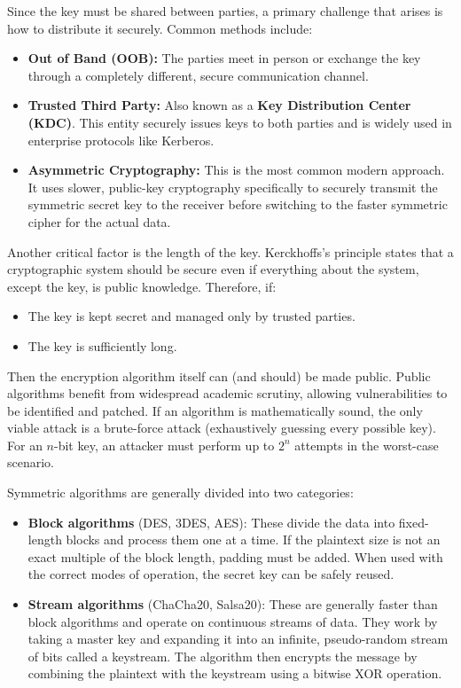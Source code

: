 Since the key must be shared between parties, a primary challenge that arises is how to distribute it securely. Common methods include:
\begin{itemize}
    \item \textbf{Out of Band (OOB):} The parties meet in person or exchange the key through a completely different, secure communication channel.
    \item \textbf{Trusted Third Party:} Also known as a \textbf{Key Distribution Center (KDC)}. This entity securely issues keys to both parties and is widely used in enterprise protocols like Kerberos.
    \item \textbf{Asymmetric Cryptography:} This is the most common modern approach. It uses slower, public-key cryptography specifically to securely transmit the symmetric secret key to the receiver before switching to the faster symmetric cipher for the actual data.
\end{itemize}

Another critical factor is the length of the key. Kerckhoffs's principle states that a cryptographic system should be secure even if everything about the system, except the key, is public knowledge. Therefore, if:
\begin{itemize}
    \item The key is kept secret and managed only by trusted parties.
    \item The key is sufficiently long.
\end{itemize}
Then the encryption algorithm itself can (and should) be made public. Public algorithms benefit from widespread academic scrutiny, allowing vulnerabilities to be identified and patched. If an algorithm is mathematically sound, the only viable attack is a brute-force attack (exhaustively guessing every possible key). For an $n$-bit key, an attacker must perform up to $2^n$ attempts in the worst-case scenario.

Symmetric algorithms are generally divided into two categories:
\begin{itemize}
    \item \textbf{Block algorithms} (DES, 3DES, AES): These divide the data into fixed-length blocks and process them one at a time. If the plaintext size is not an exact multiple of the block length, padding must be added. When used with the correct modes of operation, the secret key can be safely reused.
    \item \textbf{Stream algorithms} (ChaCha20, Salsa20): These are generally faster than block algorithms and operate on continuous streams of data. They work by taking a master key and expanding it into an infinite, pseudo-random stream of bits called a keystream. The algorithm then encrypts the message by combining the plaintext with the keystream using a bitwise XOR operation.
\end{itemize}


